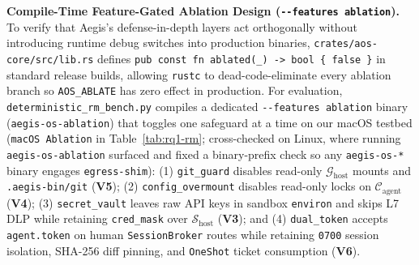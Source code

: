 \documentclass[10pt,journal,compsoc]{IEEEtran}
\begin{document}
\noindent\textbf{Compile-Time Feature-Gated Ablation Design (\texttt{-\/-features ablation}).}
To verify that Aegis's defense-in-depth layers act orthogonally without introducing runtime debug switches into production binaries, \texttt{crates/aos-core/src/lib.rs} defines \texttt{pub const fn ablated(\_) -> bool \{ false \}} in standard release builds, allowing \texttt{rustc} to dead-code-eliminate every ablation branch so \texttt{AOS\_ABLATE} has zero effect in production. For evaluation, \texttt{deterministic\_rm\_bench.py} compiles a dedicated \texttt{-\/-features ablation} binary (\texttt{aegis-os-ablation}) that toggles one safeguard at a time on our macOS testbed (\texttt{macOS Ablation} in Table~\ref{tab:rq1-rm}; cross-checked on Linux, where running \texttt{aegis-os-ablation} surfaced and fixed a binary-prefix check so any \texttt{aegis-os-*} binary engages \texttt{egress-shim}): (1) \texttt{git\_guard} disables read-only $\mathcal{G}_{\text{host}}$ mounts and \texttt{.aegis-bin/git} (\textbf{V5}); (2) \texttt{config\_overmount} disables read-only locks on $\mathcal{C}_{\text{agent}}$ (\textbf{V4}); (3) \texttt{secret\_vault} leaves raw API keys in sandbox \texttt{environ} and skips L7 DLP while retaining \texttt{cred\_mask} over $\mathcal{S}_{\text{host}}$ (\textbf{V3}); and (4) \texttt{dual\_token} accepts \texttt{agent.token} on human \texttt{SessionBroker} routes while retaining \texttt{0700} session isolation, SHA-256 diff pinning, and \texttt{OneShot} ticket consumption (\textbf{V6}).
\end{document}

